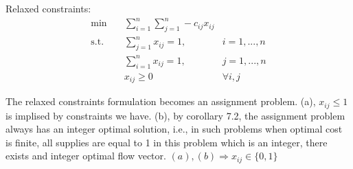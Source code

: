 \documentclass{article}
\newcommand{\1}{\bm 1}
\begin{document}
Relaxed constraints:
\begin{align*}
    \min \quad & \sum^{n}_{i=1}\sum^{n}_{j=1} -c_{ij}x_{ij}   \\
    \text{s.t.} \quad & \sum^{n}_{j=1} x_{ij} = 1, & i = 1, ..., n \\
    & \sum^{n}_{i=1} x_{ij} = 1, & j = 1, ..., n\\
    & x_{ij} \geq 0 & \forall i,j
\end{align*}

The relaxed constraints formulation becomes an assignment problem. 
(a), $x_{ij} \leq 1$ is implised by constraints we have.
(b), by corollary 7.2, the assignment problem always has an integer optimal solution, i.e., in such problems when optimal cost is finite, all supplies are equal to 1 in this problem which is an integer, there exists and integer optimal flow vector.
$(a), (b) \Rightarrow x_{ij} \in \{0, 1\}$ 


\section{}
\end{document}
